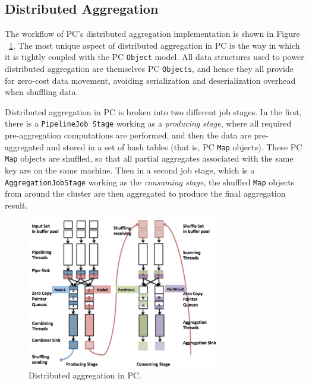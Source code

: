 \subsection{Distributed Aggregation}

The workflow of PC's distributed aggregation implementation is
shown in Figure ~\ref{fig:aggregation}.
The most unique aspect of distributed aggregation in PC is the way in which it is tightly coupled with the PC \texttt{Object} model.  All data structures used
to power distributed aggregation are themselves PC \texttt{Objects}, and hence they all provide for zero-cost data movement, avoiding
serialization and deserialization overhead when shuffling data.

Distributed aggregation in PC is broken into two different job stages.
In the first, there is a \texttt{PipelineJob Stage} working as a \emph{producing stage},
where all required pre-aggregation computations are performed, and then the
data are pre-aggregated and stored in a set of hash tables (that is, PC \texttt{Map} objects).  These PC \texttt{Map} objects are shuffled, so that all partial aggregates
associated with the same key are on the same machine.  Then in a
second job stage, which is a \texttt{AggregationJobStage} working as the \emph{consuming stage},
the shuffled \texttt{Map} objects from around the cluster are then aggregated
to produce the final aggregation result.

\begin{figure}
\centering
\includegraphics[width=0.75\textwidth]{aggregation.pdf}
  \caption{\label{fig:aggregation} Distributed aggregation in PC.}
\end{figure}

